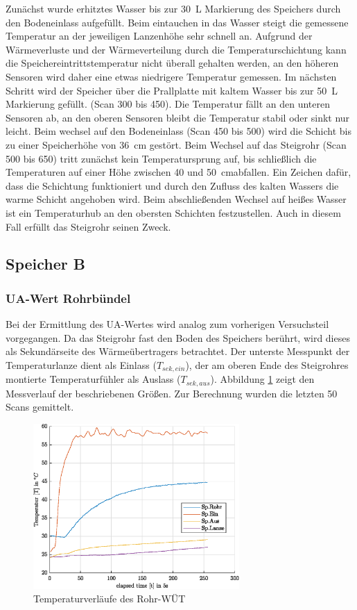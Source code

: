 Zunächst wurde erhitztes Wasser bis zur \SI{30}{\liter} Markierung des Speichers durch den Bodeneinlass aufgefüllt. Beim eintauchen in das Wasser steigt die gemessene Temperatur an der jeweiligen Lanzenhöhe sehr schnell an. Aufgrund der Wärmeverluste und der Wärmeverteilung durch die Temperaturschichtung kann die Speichereintrittstemperatur nicht überall gehalten werden, an den höheren Sensoren wird daher eine etwas niedrigere Temperatur gemessen. Im nächsten Schritt wird der Speicher über die Prallplatte mit kaltem Wasser bis zur \SI{50}{\liter} Markierung gefüllt. (Scan 300 bis 450). Die Temperatur fällt an den unteren Sensoren ab, an den oberen Sensoren bleibt die Temperatur stabil oder sinkt nur leicht. Beim wechsel auf den Bodeneinlass (Scan 450 bis 500) wird die Schicht bis zu einer Speicherhöhe von \SI{36}{\centi\meter} gestört. Beim Wechsel auf das Steigrohr (Scan 500 bis 650) tritt zunächst kein Temperatursprung auf, bis schließlich die Temperaturen auf einer Höhe zwischen 40 und \SI{50}{\centi\meter}abfallen. Ein Zeichen dafür, dass die Schichtung funktioniert und durch den Zufluss des kalten Wassers die warme Schicht angehoben wird. Beim abschließenden Wechsel auf heißes Wasser ist ein Temperaturhub an den obersten Schichten festzustellen. Auch in diesem Fall erfüllt das Steigrohr seinen Zweck.

\subsection{Speicher B}
\subsubsection{UA-Wert Rohrbündel}
Bei der Ermittlung des UA-Wertes wird analog zum vorherigen Versuchsteil vorgegangen. Da das Steigrohr fast den  Boden des Speichers berührt, wird dieses als Sekundärseite des Wärmeübertragers betrachtet. Der unterste Messpunkt der Temperaturlanze dient als Einlass ($T_{sek,ein}$), der am oberen Ende des Steigrohres montierte Temperaturfühler als Auslass ($T_{sek,aus}$). Abbildung \ref{fig:intWT} zeigt den Messverlauf der beschriebenen Größen. Zur Berechnung wurden die letzten 50 Scans gemittelt.

\begin{figure}[H]
	\centering
	\includegraphics[width=0.7\textwidth]{../DATA/RohrWT_B.eps}
	\caption[Temperaturverläufe des Rohr-WÜT]{Temperaturverläufe des Rohr-WÜT}
	\label{fig:intWT}
\end{figure}

